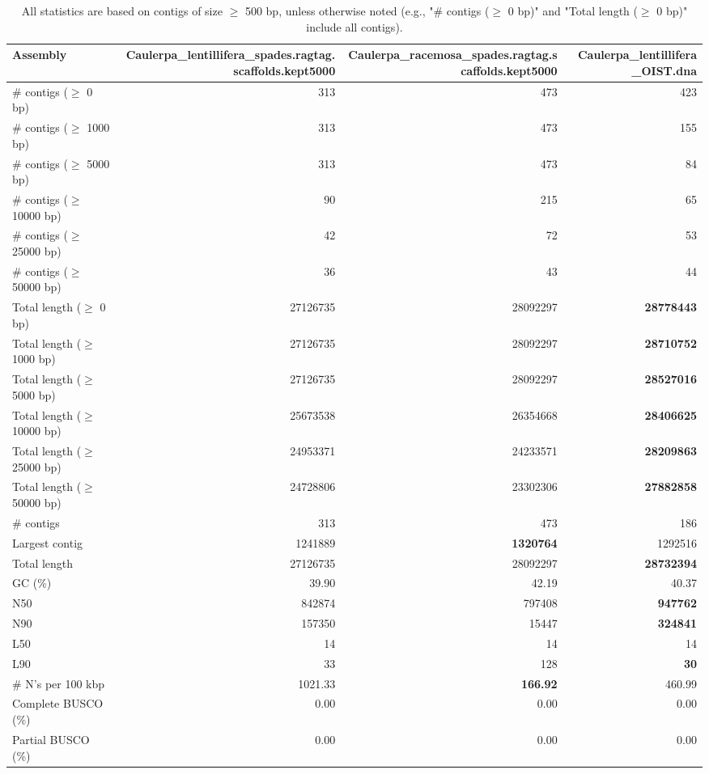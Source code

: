 \documentclass[12pt,a4paper]{article}
\begin{document}
\begin{table}[ht]
\begin{center}
\caption{All statistics are based on contigs of size $\geq$ 500 bp, unless otherwise noted (e.g., "\# contigs ($\geq$ 0 bp)" and "Total length ($\geq$ 0 bp)" include all contigs).}
\begin{tabular}{|l*{3}{|r}|}
\hline
Assembly & Caulerpa\_lentillifera\_spades.ragtag.scaffolds.kept5000 & Caulerpa\_racemosa\_spades.ragtag.scaffolds.kept5000 & Caulerpa\_lentillifera\_OIST.dna \\ \hline
\# contigs ($\geq$ 0 bp) & 313 & 473 & 423 \\ \hline
\# contigs ($\geq$ 1000 bp) & 313 & 473 & 155 \\ \hline
\# contigs ($\geq$ 5000 bp) & 313 & 473 & 84 \\ \hline
\# contigs ($\geq$ 10000 bp) & 90 & 215 & 65 \\ \hline
\# contigs ($\geq$ 25000 bp) & 42 & 72 & 53 \\ \hline
\# contigs ($\geq$ 50000 bp) & 36 & 43 & 44 \\ \hline
Total length ($\geq$ 0 bp) & 27126735 & 28092297 & {\bf 28778443} \\ \hline
Total length ($\geq$ 1000 bp) & 27126735 & 28092297 & {\bf 28710752} \\ \hline
Total length ($\geq$ 5000 bp) & 27126735 & 28092297 & {\bf 28527016} \\ \hline
Total length ($\geq$ 10000 bp) & 25673538 & 26354668 & {\bf 28406625} \\ \hline
Total length ($\geq$ 25000 bp) & 24953371 & 24233571 & {\bf 28209863} \\ \hline
Total length ($\geq$ 50000 bp) & 24728806 & 23302306 & {\bf 27882858} \\ \hline
\# contigs & 313 & 473 & 186 \\ \hline
Largest contig & 1241889 & {\bf 1320764} & 1292516 \\ \hline
Total length & 27126735 & 28092297 & {\bf 28732394} \\ \hline
GC (\%) & 39.90 & 42.19 & 40.37 \\ \hline
N50 & 842874 & 797408 & {\bf 947762} \\ \hline
N90 & 157350 & 15447 & {\bf 324841} \\ \hline
L50 & 14 & 14 & 14 \\ \hline
L90 & 33 & 128 & {\bf 30} \\ \hline
\# N's per 100 kbp & 1021.33 & {\bf 166.92} & 460.99 \\ \hline
Complete BUSCO (\%) & 0.00 & 0.00 & 0.00 \\ \hline
Partial BUSCO (\%) & 0.00 & 0.00 & 0.00 \\ \hline
\end{tabular}
\end{center}
\end{table}
\end{document}
